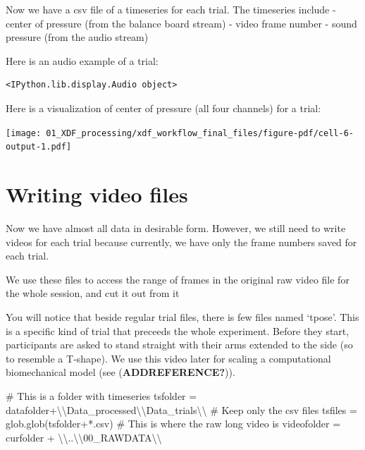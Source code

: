 \documentclass[
  letterpaper,
  DIV=11,
  numbers=noendperiod]{scrreprt}
\newenvironment{Shaded}{\begin{snugshade}}{\end{snugshade}}
\newcommand{\CharTok}[1]{\textcolor[rgb]{0.13,0.47,0.30}{#1}}
\newcommand{\CommentTok}[1]{\textcolor[rgb]{0.37,0.37,0.37}{#1}}
\newcommand{\NormalTok}[1]{\textcolor[rgb]{0.00,0.23,0.31}{#1}}
\newcommand{\OperatorTok}[1]{\textcolor[rgb]{0.37,0.37,0.37}{#1}}
\newcommand{\StringTok}[1]{\textcolor[rgb]{0.13,0.47,0.30}{#1}}
\begin{document}
Now we have a csv file of a timeseries for each trial. The timeseries
include - center of pressure (from the balance board stream) - video
frame number - sound pressure (from the audio stream)

Here is an audio example of a trial:

\begin{verbatim}
<IPython.lib.display.Audio object>
\end{verbatim}

Here is a visualization of center of pressure (all four channels) for a
trial:

\texttt{[image: 01\_XDF\_processing/xdf\_workflow\_final\_files/figure-pdf/cell-6-output-1.pdf]}


\chapter{Writing video files}\label{writing-video-files}

Now we have almost all data in desirable form. However, we still need to
write videos for each trial because currently, we have only the frame
numbers saved for each trial.

We use these files to access the range of frames in the original raw
video file for the whole session, and cut it out from it

You will notice that beside regular trial files, there is few files
named `tpose'. This is a specific kind of trial that preceeds the whole
experiment. Before they start, participants are asked to stand straight
with their arms extended to the side (so to resemble a T-shape). We use
this video later for scaling a computational biomechanical model (see
(\textbf{ADDREFERENCE?})).

\begin{Shaded}
\begin{Highlighting}[]
\CommentTok{\# This is a folder with timeseries}
\NormalTok{tsfolder }\OperatorTok{=}\NormalTok{ datafolder}\OperatorTok{+}\StringTok{\textquotesingle{}}\CharTok{\textbackslash{}\textbackslash{}}\StringTok{Data\_processed}\CharTok{\textbackslash{}\textbackslash{}}\StringTok{Data\_trials}\CharTok{\textbackslash{}\textbackslash{}}\StringTok{\textquotesingle{}}
\CommentTok{\# Keep only the csv files}
\NormalTok{tsfiles }\OperatorTok{=}\NormalTok{ glob.glob(tsfolder}\OperatorTok{+}\StringTok{\textquotesingle{}*.csv\textquotesingle{}}\NormalTok{)}
\CommentTok{\# This is where the raw long video is}
\NormalTok{videofolder }\OperatorTok{=}\NormalTok{ curfolder }\OperatorTok{+} \StringTok{\textquotesingle{}}\CharTok{\textbackslash{}\textbackslash{}}\StringTok{..}\CharTok{\textbackslash{}\textbackslash{}}\StringTok{00\_RAWDATA}\CharTok{\textbackslash{}\textbackslash{}}\StringTok{\textquotesingle{}}
\end{Highlighting}
\end{Shaded}
\end{document}
